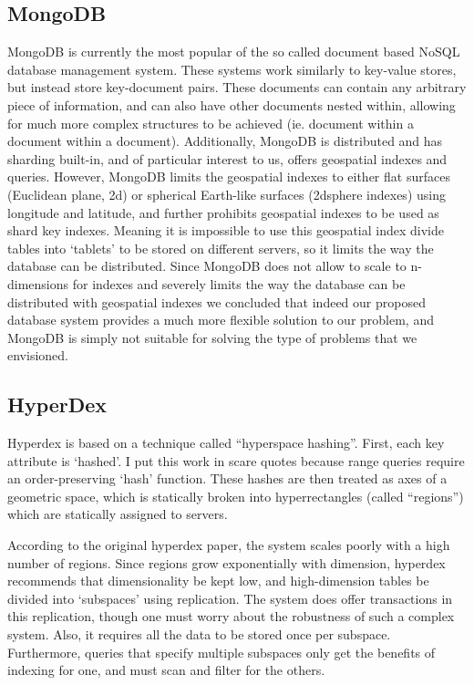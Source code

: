 \documentclass[11pt]{article}
\begin{document}
\subsection{MongoDB}

MongoDB is currently the most popular of the so called document based NoSQL database management system. These systems work similarly to key-value stores, but instead store key-document pairs. These documents can contain any arbitrary piece of information, and can also have other documents nested within, allowing for much more complex structures to be achieved (ie. document within a document within a document). Additionally, MongoDB is distributed and has sharding built-in, and of particular interest to us, offers geospatial indexes and queries. However, MongoDB limits the geospatial indexes to either flat surfaces (Euclidean plane, 2d) or spherical Earth-like surfaces (2dsphere indexes) using longitude and latitude, and further prohibits geospatial indexes to be used as shard key indexes. Meaning it is impossible to use this geospatial index divide tables into `tablets' to be stored on different servers, so it limits the way the database can be distributed. Since MongoDB does not allow to scale to n-dimensions for indexes and severely limits the way the database can be distributed with geospatial indexes we concluded that indeed our proposed database system provides a much more flexible solution to our problem, and MongoDB is simply not suitable for solving the type of problems that we envisioned.

\subsection{HyperDex}

Hyperdex is based on a technique called ``hyperspace hashing''. First, each key attribute is `hashed'. I put this work in scare quotes because range queries require an order-preserving `hash' function. These hashes are then treated as axes of a geometric space, which is statically broken into hyperrectangles (called ``regions'') which are statically assigned to servers.

According to the original hyperdex paper, the system scales poorly with a high number of regions. Since regions grow exponentially with dimension, hyperdex recommends that dimensionality be kept low, and high-dimension tables be divided into `subspaces' using replication. The system does offer transactions in this replication, though one must worry about the robustness of such a complex system. Also, it requires all the data to be stored once per subspace. Furthermore, queries that specify multiple subspaces only get the benefits of indexing for one, and must scan and filter for the others.
\end{document}

